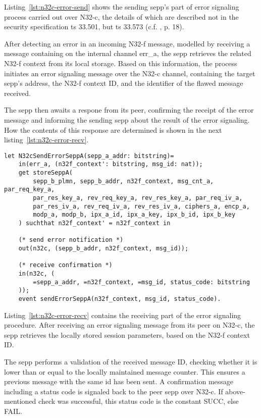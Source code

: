 Listing~\ref{lst:n32c-error-send} shows the sending \gls{sepp}'s part of error signaling process carried out over N32-c, the details of which are described not in the security specification \gls{ts} 33.501, but \gls{ts} 33.573 (c.f. \cite{3gpp.29.573}, p. 18).

After detecting an error in an incoming N32-f message, modelled by receiving a message containing on the internal channel {\sffamily err\_a}, the \gls{sepp} retrieves the related N32-f context from its local storage.
Based on this information, the process initiates an error signaling message over the N32-c channel, containing the target \gls{sepp}'s address, the N32-f context ID, and the identifier of the flawed message received.

The \gls{sepp} then awaits a respone from its peer, confirming the receipt of the error message and informing the sending \gls{sepp} about the result of the error signaling.
How the contents of this response are determined is shown in the next listing~\ref{lst:n32c-error-recv}.

\begin{lstlisting}[caption={Definition of the sending error signaling process},label={lst:n32c-error-send},firstnumber=406]
let N32cSendErrorSeppA(sepp_a_addr: bitstring)=
    in(err_a, (n32f_context': bitstring, msg_id: nat));
    get storeSeppA(
        sepp_b_plmn, sepp_b_addr, n32f_context, msg_cnt_a, par_req_key_a,
        par_res_key_a, rev_req_key_a, rev_res_key_a, par_req_iv_a,
        par_res_iv_a, rev_req_iv_a, rev_res_iv_a, ciphers_a, encp_a,
        modp_a, modp_b, ipx_a_id, ipx_a_key, ipx_b_id, ipx_b_key
    ) suchthat n32f_context' = n32f_context in

    (* send error notification *)
    out(n32c, (sepp_b_addr, n32f_context, msg_id));

    (* receive confirmation *)
    in(n32c, (
        =sepp_a_addr, =n32f_context, =msg_id, status_code: bitstring
    ));
    event sendErrorSeppA(n32f_context, msg_id, status_code).
\end{lstlisting}

Listing~\ref{lst:n32c-error-recv} contains the receiving part of the error signaling procedure.
After receiving an error signaling message from its peer on N32-c, the \gls{sepp} retrieves the locally stored session parameters, based on the N32-f context ID.

The \gls{sepp} performs a validation of the received message ID, checking whether it is lower than or equal to the locally maintained message counter.
This ensures a previous message with the same id has been sent.
A confirmation message including a status code is signaled back to the peer \gls{sepp} over N32-c.
If above-mentioned check was successful, this status code is the constant {\sffamily SUCC}, else {\sffamily FAIL}.

